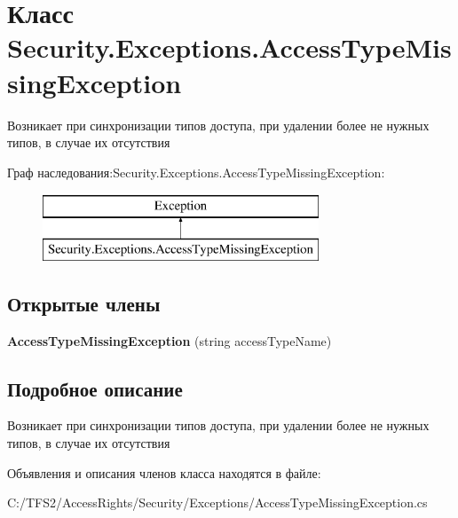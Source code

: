 \hypertarget{class_security_1_1_exceptions_1_1_access_type_missing_exception}{}\section{Класс Security.\+Exceptions.\+Access\+Type\+Missing\+Exception}
\label{class_security_1_1_exceptions_1_1_access_type_missing_exception}


Возникает при синхронизации типов доступа, при удалении более не нужных типов, в случае их отсутствия  


Граф наследования\+:Security.\+Exceptions.\+Access\+Type\+Missing\+Exception\+:\begin{figure}[H]
\begin{center}
\leavevmode
\includegraphics[height=2.000000cm]{d0/d78/class_security_1_1_exceptions_1_1_access_type_missing_exception}
\end{center}
\end{figure}
\subsection*{Открытые члены}
\begin{DoxyCompactItemize}
\item 
\mbox{\label{class_security_1_1_exceptions_1_1_access_type_missing_exception_ac07ddca93750afc6235e27b35794dd0c}} 
{\bfseries Access\+Type\+Missing\+Exception} (string access\+Type\+Name)
\end{DoxyCompactItemize}


\subsection{Подробное описание}
Возникает при синхронизации типов доступа, при удалении более не нужных типов, в случае их отсутствия 



Объявления и описания членов класса находятся в файле\+:\begin{DoxyCompactItemize}
\item 
C\+:/\+T\+F\+S2/\+Access\+Rights/\+Security/\+Exceptions/Access\+Type\+Missing\+Exception.\+cs\end{DoxyCompactItemize}

